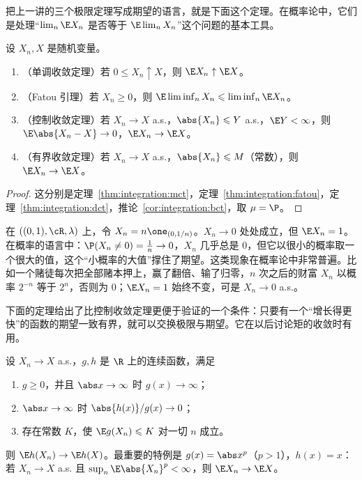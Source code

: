把上一讲的三个极限定理写成期望的语言，就是下面这个定理。在概率论中，它们是处理“$\lim_n\E X_n$ 是否等于 $\E\lim_nX_n$”这个问题的基本工具。

\begin{theorem}[期望的极限定理]\label{thm:expectation:limits}
设 $X_n,X$ 是随机变量。
\begin{enumerate}
\item （单调收敛定理）若 $0\leqslant X_n\uparrow X$，则 $\E X_n\uparrow \E X$。
\item （Fatou 引理）若 $X_n\geqslant0$，则 $\E\liminf_nX_n\leqslant\liminf_n\E X_n$。
\item （控制收敛定理）若 $X_n\to X$ a.s.，$\abs{X_n}\leqslant Y$ a.s.，$\E Y<\infty$，则 $\E\abs{X_n-X}\to0$，$\E X_n\to \E X$。
\item （有界收敛定理）若 $X_n\to X$ a.s.，$\abs{X_n}\leqslant M$（常数），则 $\E X_n\to \E X$。
\end{enumerate}
\end{theorem}
\begin{proof}
这分别是定理~\ref{thm:integration:mct}，定理~\ref{thm:integration:fatou}，定理~\ref{thm:integration:dct}，推论~\ref{cor:integration:bct}，取 $\mu=\P$。
\end{proof}

\begin{example}[期望的极限不等于极限的期望]\label{ex:expectation:no-interchange}
在 $((0,1),\cR,\lambda)$ 上，令 $X_n=n\one_{(0,1/n)}$。$X_n\to0$ 处处成立，但 $\E X_n=1$。在概率的语言中：$\P(X_n\neq0)=\frac1n\to0$，$X_n$ 几乎总是 $0$，但它以很小的概率取一个很大的值，这个“小概率的大值”撑住了期望。这类现象在概率论中非常普遍。比如一个赌徒每次把全部赌本押上，赢了翻倍、输了归零，$n$ 次之后的财富 $X_n$ 以概率 $2^{-n}$ 等于 $2^n$，否则为 $0$；$\E X_n=1$ 始终不变，可是 $X_n\to0$ a.s.。
\end{example}

下面的定理给出了比控制收敛定理更便于验证的一个条件：只要有一个“增长得更快”的函数的期望一致有界，就可以交换极限与期望。它在以后讨论矩的收敛时有用。

\begin{theorem}[用高阶矩控制极限★]\label{thm:expectation:moment-control}
设 $X_n\to X$ a.s.，$g,h$ 是 $\R$ 上的连续函数，满足
\begin{enumerate}
\item $g\geqslant0$，并且 $\abs x\to\infty$ 时 $g(x)\to\infty$；
\item $\abs x\to\infty$ 时 $\abs{h(x)}/g(x)\to0$；
\item 存在常数 $K$，使 $\E g(X_n)\leqslant K$ 对一切 $n$ 成立。
\end{enumerate}
则 $\E h(X_n)\to \E h(X)$。最重要的特例是 $g(x)=\abs x^p$（$p>1$），$h(x)=x$：若 $X_n\to X$ a.s. 且 $\sup_n\E\abs{X_n}^p<\infty$，则 $\E X_n\to \E X$。
\end{theorem}

